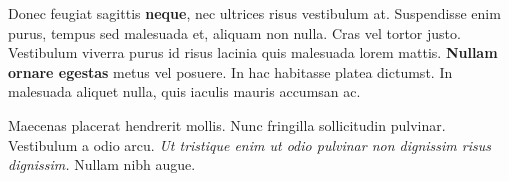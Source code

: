 
Donec feugiat sagittis \textbf{neque}, nec ultrices risus vestibulum at. Suspendisse enim purus, tempus sed malesuada et, aliquam non nulla. Cras vel tortor justo. Vestibulum viverra purus id risus lacinia quis malesuada lorem mattis. \textbf{Nullam ornare egestas} metus vel posuere. In hac habitasse platea dictumst. In malesuada aliquet nulla, quis iaculis mauris accumsan ac.

Maecenas placerat hendrerit mollis. Nunc fringilla sollicitudin pulvinar. Vestibulum a odio arcu. \textit{Ut tristique enim ut odio pulvinar non dignissim risus dignissim.} Nullam nibh augue.

